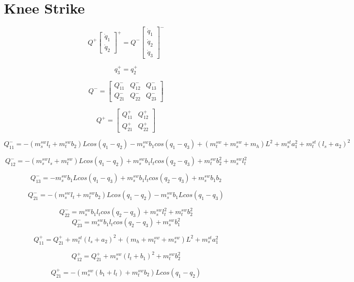 \section{Knee Strike}

\[
Q^{+}\left[\begin{array}{c}
\dot{q}_{1}\\
\dot{q}_{2}\end{array}\right]^{+}=Q^{-}\left[\begin{array}{c}
\dot{q}_{1}\\
\dot{q}_{2}\\
\dot{q}_{3}\end{array}\right]^{-}\]


\[
q_{3}^{+}=q_{2}^{+}\]


\[
Q^{-}=\left[\begin{array}{ccc}
Q_{11}^{-} & Q_{12}^{-} & Q_{13}^{-}\\
Q_{21}^{-} & Q_{22}^{-} & Q_{23}^{-}\end{array}\right]\]


\[
Q^{+}=\left[\begin{array}{cc}
Q_{11}^{+} & Q_{12}^{+}\\
Q_{21}^{+} & Q_{22}^{+}\end{array}\right]\]


\[
Q_{11}^{-}=-(m_{s}^{sw}l_{t}+m_{t}^{sw}b_{2})Lcos(q_{1}-q_{2})-m_{s}^{sw}b_{1}cos(q_{1}-q_{3})+(m_{t}^{sw}+m_{s}^{sw}+m_{h})L^{2}+m_{s}^{st}a_{1}^{2}+m_{t}^{st}(l_{s}+a_{2})^{2}\]


\[
Q_{12}^{-}=-(m_{s}^{sw}l_{s}+m_{t}^{sw})Lcos(q_{1}-q_{2})+m_{s}^{sw}b_{1}l_{t}cos(q_{2}-q_{3})+m_{t}^{sw}b_{2}^{2}+m_{s}^{sw}l_{t}^{2}\]


\[
Q_{13}^{-}=-m_{s}^{sw}b_{1}Lcos(q_{1}-q_{3})+m_{s}^{sw}b_{1}l_{t}cos(q_{2}-q_{3})+m_{s}^{sw}b_{1}b_{2}\]


\[
Q_{21}^{-}=-(m_{s}^{sw}l_{t}+m_{t}^{sw}b_{2})Lcos(q_{1}-q_{2})-m_{s}^{sw}b_{1}Lcos(q_{1}-q_{3})\]


\[
Q_{22}^{-}=m_{s}^{sw}b_{1}l_{t}cos(q_{2}-q_{3})+m_{s}^{sw}l_{t}^{2}+m_{t}^{sw}b_{2}^{2}\]
\[
Q_{23}^{-}=m_{s}^{sw}b_{1}l_{t}cos(q_{2}-q_{3})+m_{s}^{sw}b_{1}^{2}\]


\[
Q_{11}^{+}=Q_{21}^{+}+m_{t}^{st}(l_{s}+a_{2})^{2}+(m_{h}+m_{t}^{sw}+m_{s}^{sw})L^{2}+m_{s}^{st}a_{1}^{2}\]


\[
Q_{12}^{+}=Q_{21}^{+}+m_{s}^{sw}(l_{t}+b_{1})^{2}+m_{t}^{sw}b_{2}^{2}\]


\[
Q_{21}^{+}=-(m_{s}^{sw}(b_{1}+l_{t})+m_{t}^{sw}b_{2})Lcos(q_{1}-q_{2})\]


